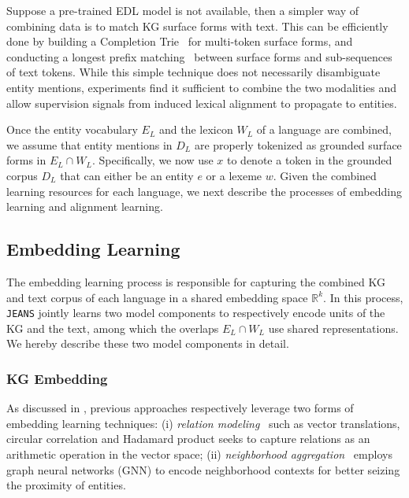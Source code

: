 \documentclass[11pt,a4paper]{article}
\newcommand{\stitle}[1]{\vspace{2ex} \noindent{\bf #1}}
\newcommand{\modelname}[0]{\texttt{JEANS}\xspace}
\begin{document}
\stitle{Surface form matching.} Suppose a pre-trained EDL model is not available, then a simpler way of combining data is to match KG surface forms with text.
This can be efficiently done by building a Completion Trie~\cite{hsu2013space} for multi-token surface forms, and conducting a longest prefix matching~\cite{dharmapurikar2006longest} between surface forms and sub-sequences of text tokens.
While this simple technique does not necessarily disambiguate entity mentions, experiments find it sufficient to combine the two modalities and allow supervision signals from induced lexical alignment to propagate to entities.


Once the entity vocabulary $E_L$ and the lexicon $W_L$ of a language are combined, we assume that entity mentions in $D_L$ are properly tokenized as grounded surface forms in $E_L \cap W_L$.
Specifically, we now use $x$ to denote a token in the grounded corpus $D_L$ that can either be an entity $e$ or a lexeme $w$.
Given the combined learning resources for each language, we next describe the processes of embedding learning and alignment learning.


\subsection{Embedding Learning}

The embedding learning process is responsible for capturing the combined KG and text corpus of each language in a shared embedding space $\mathbb{R}^{k}$.
In this process, \modelname jointly learns two model components to respectively encode units of the KG and the text,
among which the overlaps $E_L \cap W_L$ use shared representations.
We hereby describe these two model components in detail.

\subsubsection{KG Embedding}

As discussed in ,
previous approaches respectively leverage two forms of embedding learning techniques: (i) \emph{relation modeling}~\cite{chen2017multigraph,sun2018bootstrapping} 
such as vector translations,
circular correlation and Hadamard product seeks to capture relations as an arithmetic operation in the vector space;
(ii) \emph{neighborhood aggregation}~\cite{wang2018cross,yang2019aligning,cao2019multi} employs graph neural networks (GNN) to encode neighborhood contexts for better seizing the proximity of entities.
\end{document}
